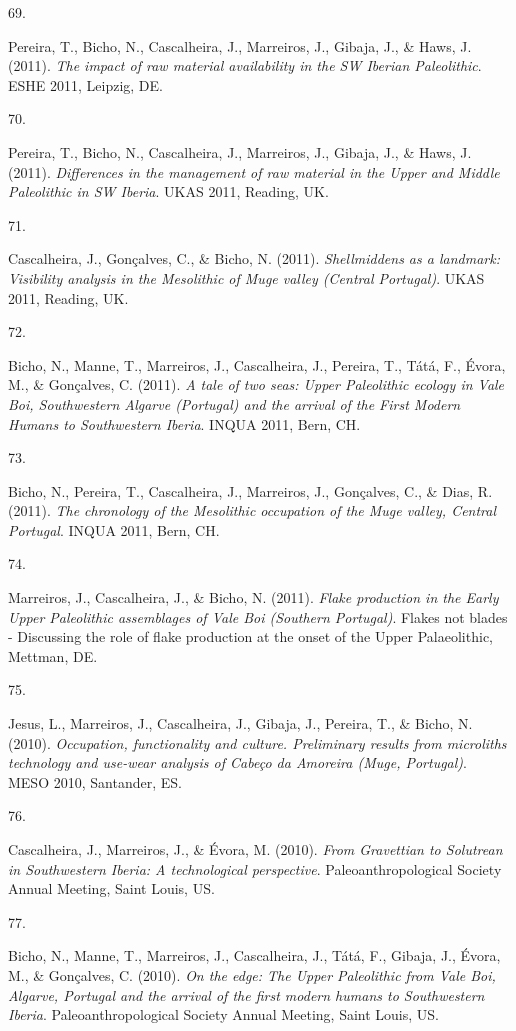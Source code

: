 \documentclass[11pt,a4paper,]{awesome-cv}
\newlength{\cslhangindent}
\newlength{\csllabelwidth}
\newenvironment{CSLReferences}[2] %
 {\begin{list}{}{%
  \setlength{\itemindent}{0pt}
  \setlength{\leftmargin}{0pt}
  \setlength{\parsep}{0pt}
  \ifodd #1
   \setlength{\leftmargin}{\cslhangindent}
   \setlength{\itemindent}{-1\cslhangindent}
  \fi
  \setlength{\itemsep}{#2\baselineskip}}}
 {\end{list}}
\newcommand{\CSLLeftMargin}[1]{\parbox[t]{\csllabelwidth}{\strut#1\strut}}
\newcommand{\CSLRightInline}[1]{\parbox[t]{\linewidth - \csllabelwidth}{\strut#1\strut}}
\begin{document}
\begin{CSLReferences}{0}{0}
\CSLLeftMargin{69. }%
\CSLRightInline{Pereira, T., Bicho, N., Cascalheira, J., Marreiros, J.,
Gibaja, J., \& Haws, J. (2011). \emph{The impact of raw material
availability in the SW Iberian Paleolithic}. ESHE 2011, Leipzig, DE.}

\CSLLeftMargin{70. }%
\CSLRightInline{Pereira, T., Bicho, N., Cascalheira, J., Marreiros, J.,
Gibaja, J., \& Haws, J. (2011). \emph{Differences in the management of
raw material in the Upper and Middle Paleolithic in SW Iberia}. UKAS
2011, Reading, UK.}

\CSLLeftMargin{71. }%
\CSLRightInline{Cascalheira, J., Gonçalves, C., \& Bicho, N. (2011).
\emph{Shellmiddens as a landmark: Visibility analysis in the Mesolithic
of Muge valley (Central Portugal)}. UKAS 2011, Reading, UK.}

\CSLLeftMargin{72. }%
\CSLRightInline{Bicho, N., Manne, T., Marreiros, J., Cascalheira, J.,
Pereira, T., Tátá, F., Évora, M., \& Gonçalves, C. (2011). \emph{A tale
of two seas: Upper Paleolithic ecology in Vale Boi, Southwestern Algarve
(Portugal) and the arrival of the First Modern Humans to Southwestern
Iberia}. INQUA 2011, Bern, CH.}

\CSLLeftMargin{73. }%
\CSLRightInline{Bicho, N., Pereira, T., Cascalheira, J., Marreiros, J.,
Gonçalves, C., \& Dias, R. (2011). \emph{The chronology of the
Mesolithic occupation of the Muge valley, Central Portugal}. INQUA 2011,
Bern, CH.}

\CSLLeftMargin{74. }%
\CSLRightInline{Marreiros, J., Cascalheira, J., \& Bicho, N. (2011).
\emph{Flake production in the Early Upper Paleolithic assemblages of
Vale Boi (Southern Portugal)}. Flakes not blades - Discussing the role
of flake production at the onset of the Upper Palaeolithic, Mettman,
DE.}

\CSLLeftMargin{75. }%
\CSLRightInline{Jesus, L., Marreiros, J., Cascalheira, J., Gibaja, J.,
Pereira, T., \& Bicho, N. (2010). \emph{Occupation, functionality and
culture. Preliminary results from microliths technology and use-wear
analysis of Cabeço da Amoreira (Muge, Portugal)}. MESO 2010, Santander,
ES.}

\CSLLeftMargin{76. }%
\CSLRightInline{Cascalheira, J., Marreiros, J., \& Évora, M. (2010).
\emph{From Gravettian to Solutrean in Southwestern Iberia: A
technological perspective}. Paleoanthropological Society Annual Meeting,
Saint Louis, US.}

\CSLLeftMargin{77. }%
\CSLRightInline{Bicho, N., Manne, T., Marreiros, J., Cascalheira, J.,
Tátá, F., Gibaja, J., Évora, M., \& Gonçalves, C. (2010). \emph{On the
edge: The Upper Paleolithic from Vale Boi, Algarve, Portugal and the
arrival of the first modern humans to Southwestern Iberia}.
Paleoanthropological Society Annual Meeting, Saint Louis, US.}

\end{CSLReferences}
\end{document}
